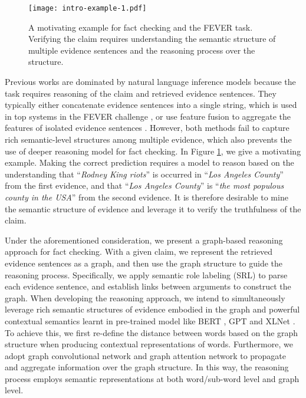 \documentclass[11pt,a4paper]{article}
\begin{document}
\begin{figure}[t]
	\centering
	\texttt{[image: intro-example-1.pdf]}
	\caption{A motivating example for fact checking and the FEVER task. Verifying the claim requires understanding the semantic structure of multiple evidence sentences and the reasoning process over the structure.}
	\label{fig:task-example}
\end{figure}


Previous works are dominated by natural language inference models \cite{dagan2013recognizing,angeli2014naturalli} because the task requires reasoning of the claim and retrieved evidence sentences.
They typically either concatenate evidence sentences into a single string, which is used in top systems in the FEVER challenge \cite{thorne2018fact}, or use  feature fusion to aggregate the features of isolated evidence sentences
\cite{zhou-etal-2019-gear}.
However, both methods fail to capture rich semantic-level structures among multiple evidence, which also prevents the use of deeper reasoning model for fact checking.
In Figure \ref{fig:task-example}, we give a motivating example.
Making the correct prediction requires a model to reason based on the understanding that ``\textit{Rodney King riots}'' is occurred in ``\textit{Los Angeles County}'' from the first evidence, and that ``\textit{Los Angeles County}'' is ``\textit{the most populous county in the USA}'' from the second evidence.
It is therefore desirable to mine the semantic structure of evidence and leverage it to verify the truthfulness of the claim.

Under the aforementioned consideration, we present a graph-based reasoning approach for fact checking.
With a given claim, we represent the retrieved evidence sentences as a graph, and then use the graph structure to guide the reasoning process.
Specifically, 
we apply 
semantic role labeling (SRL)
to parse each evidence sentence, and establish links between arguments to construct the graph. 
When developing the reasoning approach, we intend to simultaneously leverage rich semantic structures of evidence embodied in the graph and powerful contextual semantics learnt in pre-trained model like BERT \cite{devlin2018bert}, GPT \cite{radford2019language} and XLNet \cite{yang2019xlnet}.
To achieve this, we first  
re-define the distance between words based on the graph structure when producing contextual representations of words.
Furthermore, we 
adopt graph convolutional network and graph attention network to propagate and aggregate information over the graph structure. In this way, the reasoning process employs semantic representations at both word/sub-word level and graph level.
\end{document}
